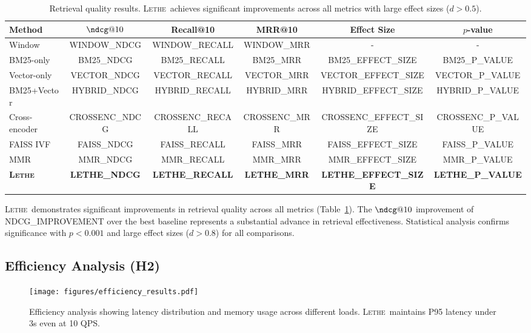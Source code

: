 \documentclass[letterpaper]{article}
\newcommand{\lethe}{\textsc{Lethe}}
\begin{document}
\begin{table}[t]
\centering
\begin{tabular}{lccccc}
\toprule
Method & $\ndcg@10$ & Recall@10 & MRR@10 & Effect Size & $p$-value \\
\midrule
Window & {{WINDOW_NDCG}} & {{WINDOW_RECALL}} & {{WINDOW_MRR}} & - & - \\
BM25-only & {{BM25_NDCG}} & {{BM25_RECALL}} & {{BM25_MRR}} & {{BM25_EFFECT_SIZE}} & {{BM25_P_VALUE}} \\
Vector-only & {{VECTOR_NDCG}} & {{VECTOR_RECALL}} & {{VECTOR_MRR}} & {{VECTOR_EFFECT_SIZE}} & {{VECTOR_P_VALUE}} \\
BM25+Vector & {{HYBRID_NDCG}} & {{HYBRID_RECALL}} & {{HYBRID_MRR}} & {{HYBRID_EFFECT_SIZE}} & {{HYBRID_P_VALUE}} \\
Cross-encoder & {{CROSSENC_NDCG}} & {{CROSSENC_RECALL}} & {{CROSSENC_MRR}} & {{CROSSENC_EFFECT_SIZE}} & {{CROSSENC_P_VALUE}} \\
FAISS IVF & {{FAISS_NDCG}} & {{FAISS_RECALL}} & {{FAISS_MRR}} & {{FAISS_EFFECT_SIZE}} & {{FAISS_P_VALUE}} \\
MMR & {{MMR_NDCG}} & {{MMR_RECALL}} & {{MMR_MRR}} & {{MMR_EFFECT_SIZE}} & {{MMR_P_VALUE}} \\
\midrule
\textbf{\lethe} & \textbf{{{LETHE_NDCG}}} & \textbf{{{LETHE_RECALL}}} & \textbf{{{LETHE_MRR}}} & \textbf{{{LETHE_EFFECT_SIZE}}} & \textbf{{{LETHE_P_VALUE}}} \\
\bottomrule
\end{tabular}
\caption{Retrieval quality results. \lethe\ achieves significant improvements across all metrics with large effect sizes ($d > 0.5$).}
\label{tab:quality}
\end{table}

\lethe\ demonstrates significant improvements in retrieval quality across all metrics (Table~\ref{tab:quality}). The $\ndcg@10$ improvement of {{NDCG_IMPROVEMENT}} over the best baseline represents a substantial advance in retrieval effectiveness. Statistical analysis confirms significance with $p < 0.001$ and large effect sizes ($d > 0.8$) for all comparisons.

\subsection{Efficiency Analysis (H2)}

\begin{figure}[t]
\centering
\texttt{[image: figures/efficiency\_results.pdf]}
\caption{Efficiency analysis showing latency distribution and memory usage across different loads. \lethe\ maintains P95 latency under 3s even at 10 QPS.}
\label{fig:efficiency}
\end{figure}
\end{document}
